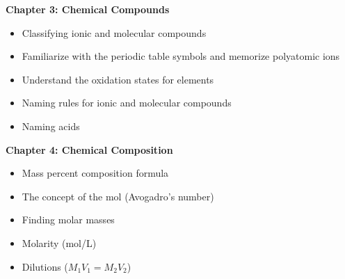 \documentclass[12pt]{article}
\begin{document}
\textbf{Chapter 3: Chemical Compounds}

\begin{itemize}
  \setlength\itemsep{0em}
\item Classifying ionic and molecular compounds
\item Familiarize with the periodic table symbols
  and memorize polyatomic ions
\item Understand the oxidation states for elements
\item Naming rules for ionic and molecular compounds
\item Naming acids
\end{itemize}

\textbf{Chapter 4: Chemical Composition}

\begin{itemize}
  \setlength\itemsep{0em}
\item Mass percent composition formula
\item The concept of the mol (Avogadro's number)
\item Finding molar masses
\item Molarity (mol/L)
\item Dilutions ($M_1V_1 = M_2V_2$)
\end{itemize}

%
\end{document}
